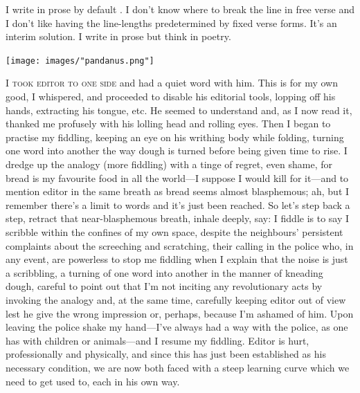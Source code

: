 \documentclass[
]{memoir}
\begin{document}
I write in prose by default . I don't know where to break the line in
free verse and I don't like having the line-lengths predetermined by
fixed verse forms. It's an interim solution. I write in prose but think
in poetry.

\begin{center}\texttt{[image: images/"pandanus.png"]}\end{center}

\lettrine[lines=3, findent=0em, nindent=0.1em, lhang=0]{I}{ took editor to one side}
and had a quiet word with him. This is for my own good, I whispered, and
proceeded to disable his editorial tools, lopping off his hands,
extracting his tongue, etc. He seemed to understand and, as I now read
it, thanked me profusely with his lolling head and rolling eyes. Then I
began to practise my fiddling, keeping an eye on his writhing body while
folding, turning one word into another the way dough is turned before
being given time to rise. I dredge up the analogy (more fiddling) with a
tinge of regret, even shame, for bread is my favourite food in all the
world---I suppose I would kill for it---and to mention editor in the
same breath as bread seems almost blasphemous; ah, but I remember
there's a limit to words and it's just been reached. So let's step back
a step, retract that near-blasphemous breath, inhale deeply, say: I
fiddle is to say I scribble within the confines of my own space, despite
the neighbours' persistent complaints about the screeching and
scratching, their calling in the police who, in any event, are powerless
to stop me fiddling when I explain that the noise is just a scribbling,
a turning of one word into another in the manner of kneading dough,
careful to point out that I'm not inciting any revolutionary acts by
invoking the analogy and, at the same time, carefully keeping editor out
of view lest he give the wrong impression or, perhaps, because I'm
ashamed of him. Upon leaving the police shake my hand---I've always had
a way with the police, as one has with children or animals---and I
resume my fiddling. Editor is hurt, professionally and physically, and
since this has just been established as his necessary condition, we are
now both faced with a steep learning curve which we need to get used to,
each in his own way.
\end{document}
